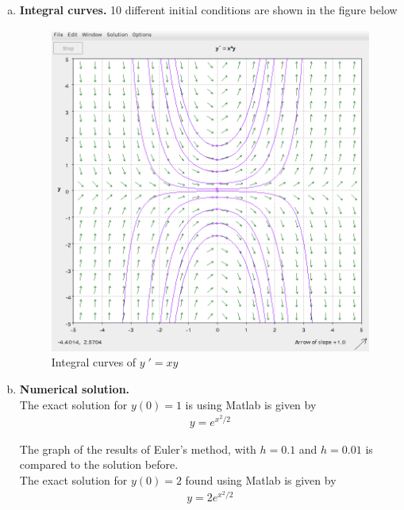 \documentclass[a4paper,12pt]{article}
\begin{document}
\begin{enumerate}[I.]
\begin{enumerate}[a)]
    \item \textbf{Integral curves.} 10 different initial conditions are shown in the figure below
        \begin{figure}[H]
      \begin{center}
        \includegraphics[scale=.3]{12.png}
        \caption{Integral curves of $y\;' = xy$}
        \label{fig:2}
      \end{center}
    \end{figure}
    \item \textbf{Numerical solution.} \\
      The exact solution for $y(0) = 1$ is using Matlab is given by
      \begin{align*}
        \displaystyle y = e^{x^2/2}
      \end{align*}
      
      The graph of the results of Euler's method, with $h=0.1$ and $h=0.01$ is compared to the solution before. \\
      
      
      The exact solution for $y(0)=2$ found using Matlab is given by
      \begin{align*}
        y = 2e^{x^2/2}
      \end{align*}
      

\end{enumerate}
\end{enumerate}
\end{document}
